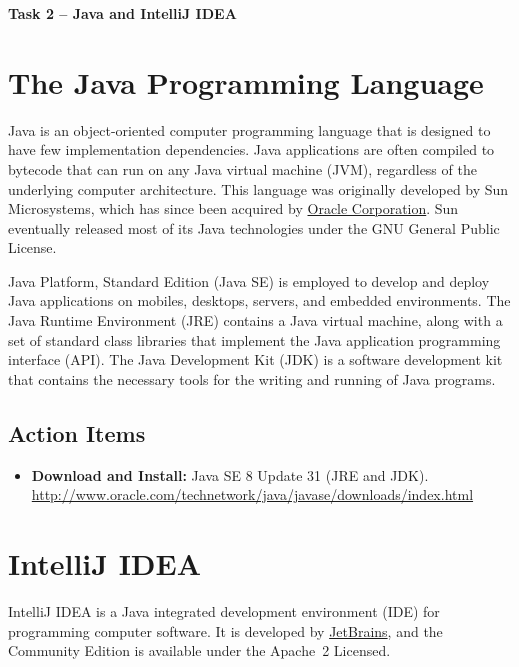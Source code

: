 \documentclass[letterpaper,11pt]{article}
\begin{document}
\begin{center}
{\bfseries \LARGE Task 2 -- Java and IntelliJ IDEA \\[8mm]}
\end{center}

\section{The Java Programming Language}

Java is an object-oriented computer programming language that is designed to have few implementation dependencies.
Java applications are often compiled to bytecode that can run on any Java virtual machine (JVM), regardless of the underlying computer architecture.
This language was originally developed by Sun Microsystems, which has since been acquired by \href{http://www.oracle.com}{Oracle Corporation}.
Sun eventually released most of its Java technologies under the GNU General Public License.

Java Platform, Standard Edition (Java SE) is employed to develop and deploy Java applications on mobiles, desktops, servers, and embedded environments.
The Java Runtime Environment (JRE) contains a Java virtual machine, along with a set of standard class libraries that implement the Java application programming interface (API).
The Java Development Kit (JDK) is a software development kit that contains the necessary tools for the writing and running of Java programs.

\subsection*{Action Items}

\begin{itemize}
\item \textbf{Download and Install:} Java SE 8 Update 31 (JRE and JDK). \\
\url{http://www.oracle.com/technetwork/java/javase/downloads/index.html}
\end{itemize}


\section{IntelliJ IDEA}

IntelliJ IDEA is a Java integrated development environment (IDE) for programming computer software.
It is developed by \href{https://www.jetbrains.com}{JetBrains}, and the Community Edition is available under the Apache~2 Licensed.
\end{document}
